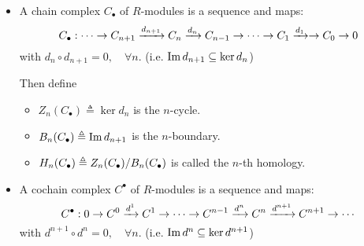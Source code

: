 \begin{definition} \mbox{}
  \begin{itemize}
    \item A chain complex $C_\bullet$ of $R$-modules is a sequence and maps:
      \[
        C_\bullet : \dotsm \to C_{n+1} \xrightarrow{d_{n+1}} C_n \xrightarrow{d_n} C_{n-1}
        \to \dotsm \to C_1 \xrightarrow{d_1} \to C_0 \to 0
      \]
      with $d_n \circ d_{n+1} = 0, \quad \forall n$.
      (i.e. $\operatorname{Im} d_{n+1} \subseteq \ker d_n$)

      Then define
      \begin{itemize}
        \item $Z_n(C_\bullet) \triangleq \ker d_n$ is the $n$-cycle.
        \item $B_n(C_\bullet) \triangleq \operatorname{Im} d_{n+1}$ is the $n$-boundary.
        \item $H_n(C_\bullet) \triangleq {Z_n(C_\bullet)}/{B_n(C_\bullet)}$
          is called the $n$-th homology.
      \end{itemize}
    \item A cochain complex $C^\bullet$ of $R$-modules is a sequence and maps:
      \[
        C^\bullet : 0 \to C^0 \xrightarrow{d^1} C^1 \to \dotsm \to
        C^{n-1} \xrightarrow{d^n} C^n \xrightarrow{d^{n+1}} C^{n+1} \to \dotsm
      \]
      with $d^{n+1} \circ d^n = 0, \quad \forall n$.
      (i.e. $\operatorname{Im} d^n \subseteq \ker d^{n+1}$)


\end{itemize}
\end{definition}
